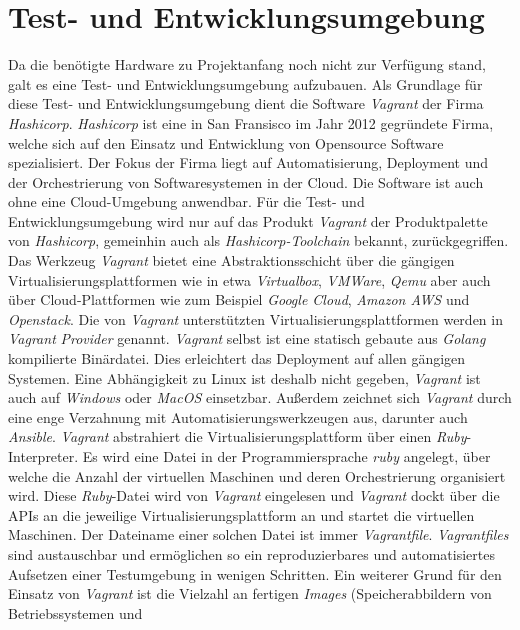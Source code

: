 \documentclass[titlepage]{report}
\begin{document}
\section{Test- und Entwicklungsumgebung}
Da die benötigte Hardware zu Projektanfang noch nicht zur Verfügung
stand, galt es eine Test\hyp{} und Entwicklungsumgebung aufzubauen. Als
Grundlage für diese Test\hyp{} und Entwicklungsumgebung dient die
Software \emph{Vagrant}\cite{VAGRANT} der Firma \emph{Hashicorp}. \emph{Hashicorp} ist
eine in San Fransisco im Jahr 2012 gegründete Firma, welche sich auf den
Einsatz und Entwicklung von Opensource Software
spezialisiert\cite{HASHICORP}. Der Fokus der Firma liegt auf
Automatisierung, Deployment und der Orchestrierung von
Softwaresystemen in der Cloud. Die Software ist auch ohne
eine Cloud\hyp{}Umgebung anwendbar. Für die Test\hyp{} und
Entwicklungsumgebung wird nur auf das Produkt \emph{Vagrant} der Produktpalette von
\emph{Hashicorp}, gemeinhin auch als \emph{Hashicorp-Toolchain} bekannt,
zurückgegriffen. Das Werkzeug \emph{Vagrant} bietet eine
Abstraktionsschicht über die gängigen Virtualisierungsplattformen wie in
etwa \emph{Virtualbox}, \emph{VMWare}, \emph{Qemu} aber auch über
Cloud\hyp{}Plattformen wie zum Beispiel \emph{Google Cloud},
\emph{Amazon AWS} und \emph{Openstack}. Die von \emph{Vagrant}
unterstützten Virtualisierungsplattformen werden in \emph{Vagrant}
\emph{Provider} genannt. \emph{Vagrant} selbst ist eine
statisch gebaute aus \emph{Golang} kompilierte Binärdatei. Dies
erleichtert das Deployment auf allen gängigen Systemen.
Eine Abhängigkeit zu Linux ist deshalb
nicht gegeben, \emph{Vagrant} ist auch auf \emph{Windows} oder
\emph{MacOS} einsetzbar\cite{VAGRANT}. Außerdem
zeichnet sich \emph{Vagrant} durch eine enge Verzahnung mit
Automatisierungswerkzeugen aus, darunter auch
\emph{Ansible}\cite{VAGRANT_DOCS}. \emph{Vagrant} abstrahiert die
Virtualisierungsplattform über einen \emph{Ruby}\hyp{}Interpreter. Es
wird eine Datei in der Programmiersprache \emph{ruby} angelegt, über
welche die Anzahl der virtuellen Maschinen und deren Orchestrierung
organisiert wird. Diese \emph{Ruby}\hyp{}Datei wird von \emph{Vagrant}
eingelesen und \emph{Vagrant} dockt über die APIs an die jeweilige
Virtualisierungsplattform an und startet die virtuellen Maschinen. Der Dateiname
einer solchen Datei ist immer \emph{Vagrantfile}. \emph{Vagrantfiles}
sind austauschbar und ermöglichen so ein reproduzierbares und
automatisiertes Aufsetzen einer Testumgebung in wenigen Schritten. Ein
weiterer Grund für den Einsatz von \emph{Vagrant} ist die Vielzahl an
fertigen \emph{Images} (Speicherabbildern von Betriebssystemen und
\end{document}

